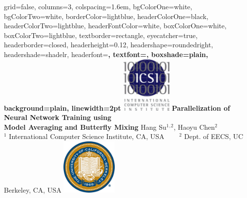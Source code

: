 \documentclass[landscape,final,archE1,fontscale=0.32]{baposter}
\begin{document}


\begin{poster}%
  {
  grid=false,
  columns=3,
  colspacing=1.6em,
  bgColorOne=white,
  bgColorTwo=white,
  borderColor=lightblue,
  headerColorOne=black,
  headerColorTwo=lightblue,
  headerFontColor=white,
  boxColorOne=white,
  boxColorTwo=lightblue,
  textborder=rectangle,
  eyecatcher=true,
  headerborder=closed,
  headerheight=0.12\textheight,
  headershape=roundedright,
  headershade=shadelr,
  headerfont=\Large\bf, %
  textfont={\setlength{\parindent}{1.5em}},
  boxshade=plain,
  background=plain,
  linewidth=2pt
  }
  {\includegraphics[height=7.5em]{images/ICSI_color}}
  {\bf{Parallelization of Neural Network Training using \\Model Averaging and Butterfly Mixing}}
  {Hang Su$^1$$^,$$^2$, Haoyu Chen$^2$\\
  $^1$ International Computer Science Institute, CA, USA ~~~ $^2$ Dept. of EECS, UC Berkeley, CA, USA }
  {%
    \includegraphics[height=7.5em]{images/ucbseal}
  }


\end{poster}
\end{document}
